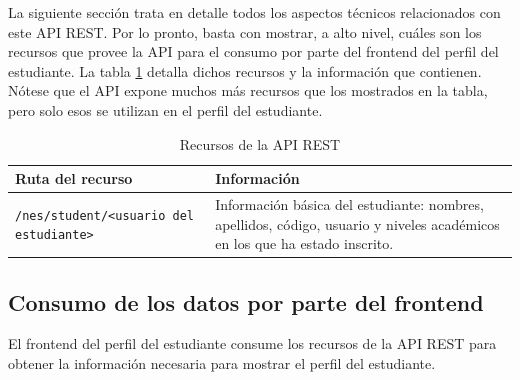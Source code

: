 La siguiente sección trata en detalle todos los aspectos técnicos relacionados con este \gls{API REST}. Por lo pronto, basta con mostrar, a alto nivel, cuáles son los recursos que provee la \gls{API} para el consumo por parte del frontend del perfil del estudiante. La tabla \ref{tab:recursos} detalla dichos recursos y la información que contienen. Nótese que el \gls{API} expone muchos más recursos que los mostrados en la tabla, pero solo esos se utilizan en el perfil del estudiante.

\begin{table}[h]
	\centering
	\caption{Recursos de la \gls{API REST}}
	\alternatecolors
	\begin{tabular}{p{3cm}p{8cm}}
		\hline
		\textbf{Ruta del recurso}                     & \textbf{Información}                                                                                                       \\
		\hline
		\verb*|/nes/student/<usuario del estudiante>| & Información básica del estudiante: nombres, apellidos, código, usuario y niveles académicos en los que ha estado inscrito. \\
		\hline
	\end{tabular}
	\label{tab:recursos}
\end{table}


\subsection{Consumo de los datos por parte del frontend}

El frontend del perfil del estudiante consume los recursos de la \gls{API REST} para obtener la información necesaria para mostrar el perfil del estudiante.